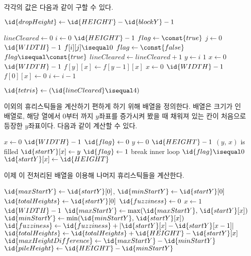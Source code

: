각각의 값은 다음과 같이 구할 수 있다.

\begin{codebox}
\li $\id{dropHeight} \gets \id{HEIGHT} - \id{blockY} - 1$
\end{codebox}

\begin{codebox}
\li $lineCleared \gets 0$
\li \For $i \gets 0$ \To $\id{HEIGHT} - 1$
\li \Do
        $flag \gets \const{true}$
\li     \For $j \gets 0$ \To $\id{WIDTH} - 1$
\li     \Do
            \If $f[i][j] \isequal 0$
\li         \Then
                $flag \gets \const{false}$
            \End
        \End
\li     \If $flag \isequal \const{true}$
            \Then
\li             $lineCleared \gets lineCleared + 1$
\li             \For $y \gets i$ \Downto $1$
\li             \Do
                    \For $x \gets 0$ \To $\id{WIDTH} - 1$
\li                 \Do
                        $f[y][x] \gets f[y - 1][x]$
                    \End
                \End
\li             \For $x \gets 0$ \To $\id{WIDTH} - 1$
\li             \Do
                    $f[0][x] \gets 0$
                \End
\li             $i \gets i - 1$
            \End
        \End
    \End
\end{codebox}

\begin{codebox}
\li $\id{tetris} \gets (\id{lineCleared} \isequal 4)$
\end{codebox}

이외의 휴리스틱들을 계산하기 편하게 하기 위해  배열을 정의한다.  배열은
크기가 인 배열로, 해당 열에서 0부터 까지 $y$좌표를 증가시켜 봤을 때 채워져 있는
칸이 처음으로 등장한 $y$좌표이다. 다음과 같이 계산할 수 있다.

\begin{codebox}
\li \For $x \gets 0$ \To $\id{WIDTH} - 1$ \Do
\li     $\id{flag} \gets 0$
\li     \For $y \gets 0$ \To $\id{HEIGHT} - 1$ \Do
\li         \If $(y,\,x)$ is filled \Then
\li             $\id{startY}[x] \gets y$
\li             $\id{flag} \gets 1$
\li             break inner loop
            \End
        \End
\li     \If $\id{flag} \isequal 0$ \Then
\li         $\id{startY}[x] \gets \id{HEIGHT}$
        \End
    \End
\end{codebox}

이제 이 전처리된 배열을 이용해 나머지 휴리스틱들을 계산한다.

\begin{codebox}
\li $\id{maxStartY} \gets \id{startY}[0]$, $\id{minStartY} \gets \id{startY}[0]$
\li $\id{totalHeights} \gets \id{startY}[0]$
\li $\id{fuzziness} \gets 0$
\li \For $x \gets 1$ \To $\id{WIDTH} - 1$ \Do
\li     $\id{maxStartY} \gets \max(\id{maxStartY},\,\id{startY}[x])$
\li     $\id{minStartY} \gets \min(\id{minStartY},\,\id{startY}[x])$
\li     $\id{fuzziness} \gets \id{fuzziness} + |\id{startY}[x] - \id{startY}[x - 1]|$
\li     $\id{totalHeights} \gets \id{totalHeights} + \id{HEIGHT} - \id{startY}[x]$
    \End
\li $\id{maxHeightDifference} \gets \id{maxStartY} - \id{minStartY}$
\li $\id{pileHeight} \gets \id{HEIGHT} - \id{minStartY}$
\end{codebox}

